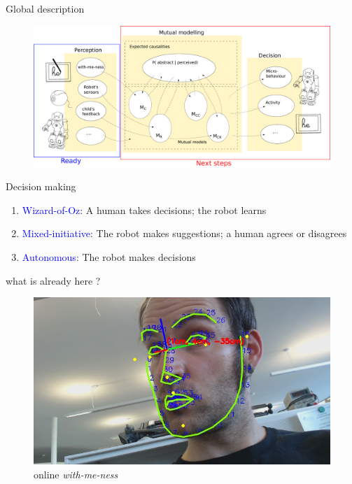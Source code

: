 \documentclass[compress]{beamer}
\begin{document}
\begin{frame}{Global description}
	\begin{figure}
        \centering
        \includegraphics[width=1\columnwidth]{archi_already}
    \end{figure}
\end{frame}

\begin{frame}{Decision making}
\begin{enumerate}
\item \textcolor{blue}{Wizard-of-Oz}: A human takes decisions; the robot learns
\item \textcolor{blue}{Mixed-initiative}: The robot makes suggestions; a human agrees or disagrees
\item \textcolor{blue}{Autonomous}: The robot makes decisions
\end{enumerate}
\end{frame}

\begin{frame}{what is already here ?}
	\begin{figure}
        \centering
        \includegraphics[width=0.8\columnwidth]{screenshot.jpg}
        \caption{online \textit{with-me-ness}}
    \end{figure}
\end{frame}
\end{document}
